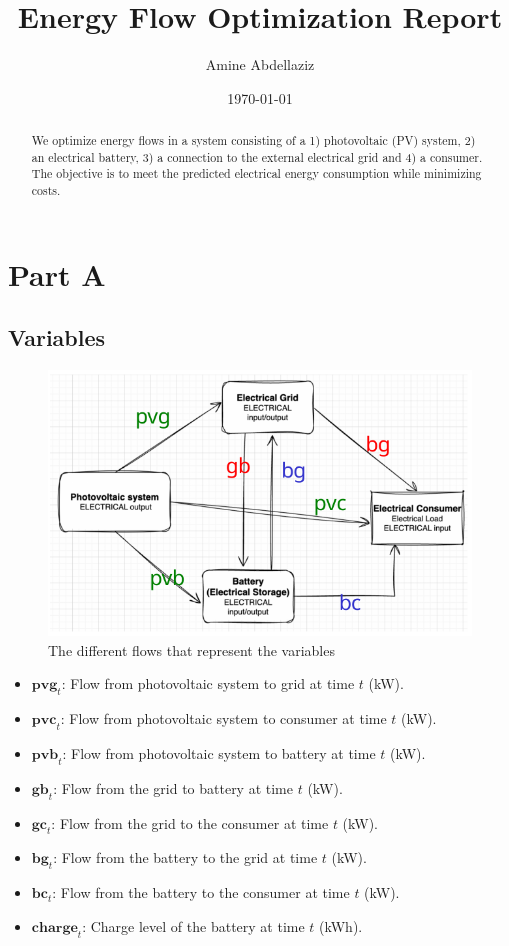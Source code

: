 \documentclass[12pt]{article}
\title{Energy Flow Optimization Report}
\author{Amine Abdellaziz}
\date{\today}
\begin{document}
\maketitle

\begin{abstract}
We optimize energy flows in a system consisting of a 1) photovoltaic (PV) system, 2) an electrical battery, 3) a connection to the external electrical grid and 4) a consumer. The objective is to meet the predicted electrical energy consumption while minimizing costs.
\end{abstract}

\section{Part A}

\subsection{Variables}

\begin{figure}
\includegraphics[width = \textwidth]{diagram}
\caption{The different flows that represent the variables}
\label{fig:diagram}
\end{figure}

\begin{itemize}
\item $\mathbf{pvg}_t$: Flow from photovoltaic system to grid at time $t$ (kW).
\item $\mathbf{pvc}_t$: Flow from photovoltaic system to consumer at time $t$ (kW).
\item $\mathbf{pvb}_t$: Flow from photovoltaic system to battery at time $t$ (kW).
\item $\mathbf{gb}_t$: Flow from the grid to battery at time $t$ (kW).
\item $\mathbf{gc}_t$: Flow from the grid to the consumer at time $t$ (kW).
\item $\mathbf{bg}_t$: Flow from the battery to the grid at time $t$ (kW).
\item $\mathbf{bc}_t$: Flow from the battery to the consumer at time $t$ (kW).
\item $\mathbf{charge}_t$: Charge level of the battery at time $t$ (kWh).
\end{itemize}
\end{document}
